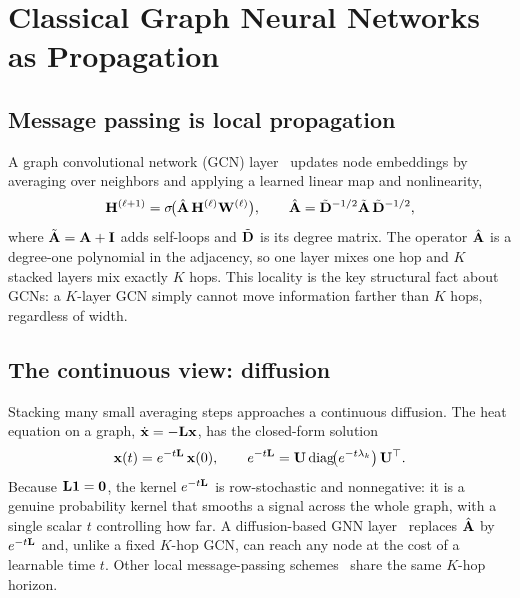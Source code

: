 \section{Classical Graph Neural Networks as Propagation}
\label{sec:classical}

\subsection{Message passing is local propagation}
A graph convolutional network (GCN) layer~\cite{kipf2017gcn,defferrard2016chebnet}
updates node embeddings by averaging over neighbors and applying a learned linear map
and nonlinearity,
\begin{equation}
\mathbf{H}^{(\ell+1)}=\sigma\!\big(\hat{\mathbf{A}}\,\mathbf{H}^{(\ell)}\mathbf{W}^{(\ell)}\big),\qquad
\hat{\mathbf{A}}=\tilde{\mathbf{D}}^{-1/2}\tilde{\mathbf{A}}\,\tilde{\mathbf{D}}^{-1/2},
\end{equation}
where $\tilde{\mathbf{A}}=\mathbf{A}+\mathbf{I}$ adds self-loops and $\tilde{\mathbf{D}}$ is its degree matrix.
The operator $\hat{\mathbf{A}}$ is a degree-one polynomial in the adjacency, so one layer
mixes one hop and $K$ stacked layers mix exactly $K$ hops. This locality is the key
structural fact about GCNs: a $K$-layer GCN simply cannot move information farther
than $K$ hops, regardless of width.

\subsection{The continuous view: diffusion}
Stacking many small averaging steps approaches a continuous diffusion. The heat
equation on a graph, $\dot{\mathbf{x}}=-\mathbf{L}\mathbf{x}$, has the closed-form solution
\begin{equation}
\mathbf{x}(t)=e^{-t\mathbf{L}}\,\mathbf{x}(0),\qquad
e^{-t\mathbf{L}}=\mathbf{U}\,\mathrm{diag}\!\big(e^{-t\lambda_k}\big)\,\mathbf{U}^{\top}.
\label{eq:heat}
\end{equation}
Because $\mathbf{L}\mathbf{1}=\mathbf{0}$, the kernel $e^{-t\mathbf{L}}$ is row-stochastic and
nonnegative: it is a genuine probability kernel that smooths a signal across the
whole graph, with a single scalar $t$ controlling how far. A diffusion-based GNN
layer~\cite{gasteiger2019diffusion} replaces $\hat{\mathbf{A}}$ by $e^{-t\mathbf{L}}$ and, unlike a
fixed $K$-hop GCN, can reach any node at the cost of a learnable time $t$. Other local
message-passing schemes~\cite{hamilton2017graphsage,velickovic2018gat} share the same
$K$-hop horizon.

